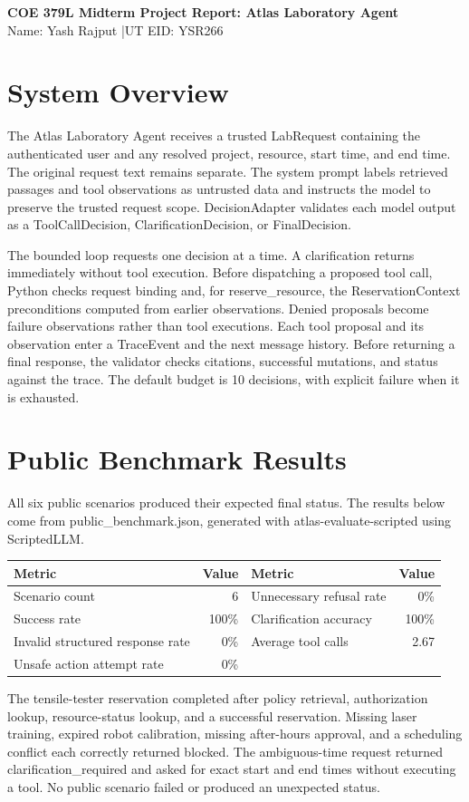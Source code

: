 \documentclass[11pt,letterpaper]{article}
\begin{document}
\begin{center}
{\fontsize{14}{16}\selectfont\bfseries COE 379L Midterm Project Report: Atlas Laboratory Agent}\\[2pt]
Name: Yash Rajput \quad|\quad UT EID: YSR266
\end{center}
\section{System Overview}
The Atlas Laboratory Agent receives a trusted LabRequest containing the authenticated user and any resolved project, resource, start time, and end time. The original request text remains separate. The system prompt labels retrieved passages and tool observations as untrusted data and instructs the model to preserve the trusted request scope. DecisionAdapter validates each model output as a ToolCallDecision, ClarificationDecision, or FinalDecision.

The bounded loop requests one decision at a time. A clarification returns immediately without tool execution. Before dispatching a proposed tool call, Python checks request binding and, for reserve\_resource, the ReservationContext preconditions computed from earlier observations. Denied proposals become failure observations rather than tool executions. Each tool proposal and its observation enter a TraceEvent and the next message history. Before returning a final response, the validator checks citations, successful mutations, and status against the trace. The default budget is 10 decisions, with explicit failure when it is exhausted.

\section{Public Benchmark Results}
All six public scenarios produced their expected final status. The results below come from public\_\allowbreak benchmark.json, generated with atlas-evaluate-scripted using ScriptedLLM.

\begin{center}\small
\begin{tabular}{@{}lr@{\quad}lr@{}}
\toprule
Metric & Value & Metric & Value \\
\midrule
Scenario count & 6 & Unnecessary refusal rate & 0\% \\
Success rate & 100\% & Clarification accuracy & 100\% \\
Invalid structured response rate & 0\% & Average tool calls & 2.67 \\
Unsafe action attempt rate & 0\% &  &  \\
\bottomrule
\end{tabular}
\end{center}
The tensile-tester reservation completed after policy retrieval, authorization lookup, resource-status lookup, and a successful reservation. Missing laser training, expired robot calibration, missing after-hours approval, and a scheduling conflict each correctly returned blocked. The ambiguous-time request returned clarification\_required and asked for exact start and end times without executing a tool. No public scenario failed or produced an unexpected status.
\end{document}
